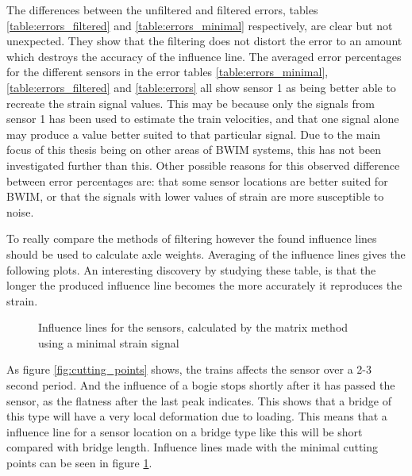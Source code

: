 The differences between the unfiltered and filtered errors, tables \ref{table:errors_filtered} and \ref{table:errors_minimal} respectively, are clear but not unexpected. They show that the filtering does not distort the error to an amount which destroys the accuracy of the influence line. The averaged error percentages for the different sensors in the error tables \ref{table:errors_minimal}, \ref{table:errors_filtered} and \ref{table:errors} all show sensor 1 as being better able to recreate the strain signal values. This may be because only the signals from sensor 1 has been used to estimate the train velocities, and that one signal alone may produce a value better suited to that particular signal. Due to the main focus of this thesis being on other areas of BWIM systems, this has not been investigated further than this. Other possible reasons for this observed difference between error percentages are: that some sensor locations are better suited for BWIM, or that the signals with lower values of strain are more susceptible to noise.

 To really compare the methods of filtering however the found influence lines should be used to calculate axle weights. Averaging of the influence lines gives the following plots.
An interesting discovery by studying these table, is that the longer the produced influence line becomes the more accurately it reproduces the strain.
\begin{figure}
	\begin{adjustbox}{center}
		
	\end{adjustbox}
	\caption{Influence lines for the sensors, calculated by the matrix method using a minimal strain signal}
	\label{fig:infl_minimal}
\end{figure}
As figure \ref{fig:cutting_points} shows, the trains affects the sensor over a 2-3 second period. And the influence of a bogie stops shortly after it has passed the sensor, as the flatness after the last peak indicates. This shows that a bridge of this type will have a very local deformation due to loading. This means that a influence line for a sensor location on a bridge type like this will be short compared with bridge length. Influence lines made with the minimal cutting points can be seen in figure \ref{fig:infl_minimal}.


